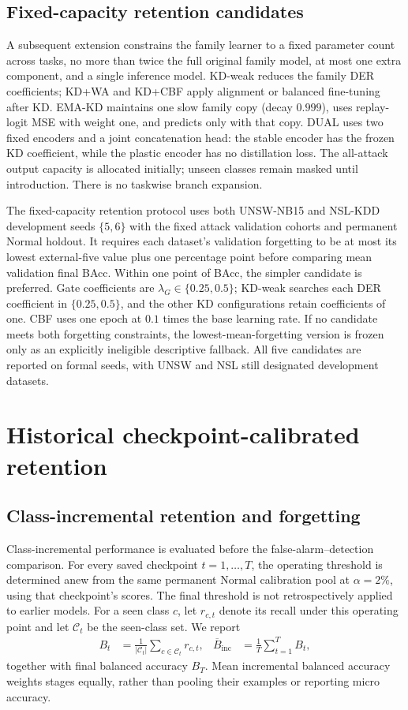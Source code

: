 \documentclass[10pt,twocolumn]{article}
\begin{document}
\subsection{Fixed-capacity retention candidates}
A subsequent extension constrains the family learner to a fixed parameter count across tasks, no more than twice the full original family model, at most one extra component, and a single inference model. KD-weak reduces the family DER coefficients; KD+WA and KD+CBF apply alignment or balanced fine-tuning after KD. EMA-KD maintains one slow family copy (decay $0.999$), uses replay-logit MSE with weight one, and predicts only with that copy. DUAL uses two fixed encoders and a joint concatenation head: the stable encoder has the frozen KD coefficient, while the plastic encoder has no distillation loss. The all-attack output capacity is allocated initially; unseen classes remain masked until introduction. There is no taskwise branch expansion.

The fixed-capacity retention protocol uses both UNSW-NB15 and NSL-KDD development seeds $\{5,6\}$ with the fixed attack validation cohorts and permanent Normal holdout. It requires each dataset's validation forgetting to be at most its lowest external-five value plus one percentage point before comparing mean validation final BAcc. Within one point of BAcc, the simpler candidate is preferred. Gate coefficients are $\lambda_G\in\{0.25,0.5\}$; KD-weak searches each DER coefficient in $\{0.25,0.5\}$, and the other KD configurations retain coefficients of one. CBF uses one epoch at $0.1$ times the base learning rate. If no candidate meets both forgetting constraints, the lowest-mean-forgetting version is frozen only as an explicitly ineligible descriptive fallback. All five candidates are reported on formal seeds, with UNSW and NSL still designated development datasets.

\section{Historical checkpoint-calibrated retention}\label{app:historical-retention}
\subsection{Class-incremental retention and forgetting}
Class-incremental performance is evaluated before the false-alarm--detection comparison. For every saved checkpoint $t=1,\ldots,T$, the operating threshold is determined anew from the same permanent Normal calibration pool at $\alpha=2\%$, using that checkpoint's scores. The final threshold is not retrospectively applied to earlier models. For a seen class $c$, let $r_{c,t}$ denote its recall under this operating point and let $\mathcal C_t$ be the seen-class set. We report
\begin{align}
 B_t&=\frac{1}{|\mathcal C_t|}\sum_{c\in\mathcal C_t}r_{c,t}, &
 \overline B_{\mathrm{inc}}&=\frac{1}{T}\sum_{t=1}^{T}B_t,
\end{align}
together with final balanced accuracy $B_T$. Mean incremental balanced accuracy weights stages equally, rather than pooling their examples or reporting micro accuracy.
\end{document}
